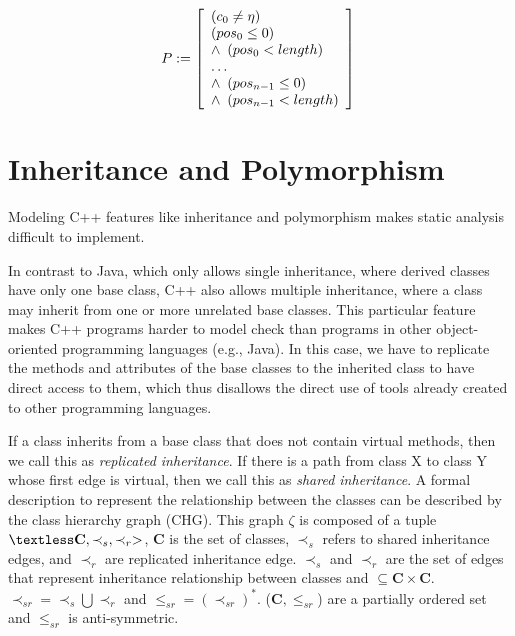 \documentclass[a4paper]{llncs}
\newcommand{\comment}[1]{}
\begin{document}
\begin{equation}
\label{cfind-string-p}
P := \left [ \begin{array}{ll}
				 \left(c_{0} \neq \eta\right) \\
	       \left(pos_{0} \leq 0\right) \\
         \wedge \, \, \left(pos_{0} < length\right)\\
	       \ldots \\
	       \wedge \, \, \left(pos_{n-1} \leq 0\right)\\
	       \wedge \, \, \left(pos_{n-1} < length\right)\\

              \end{array} \right ]  \\
\end{equation}

\section{Inheritance and Polymorphism}
\label{inheritance-and-polymorphism}

Modeling C++ features like inheritance and polymorphism
makes static analysis difficult to implement.
\comment{
Inheritance is one of the main benefits of object-oriented paradigm,
which allows a class (derived class) absorbs data and behavior
from existing classes (base class) and thus enhances it with new features.
This is the vital concept behind the creation of reusable software components
and has received much attention because it is one of the promising ways to
improve software quality.}
In contrast to Java, which only allows single inheritance, where derived classes have only one base
class, C++ also allows multiple inheritance, where a class may inherit from one
or more unrelated base classes. This particular feature makes C++ programs
harder to model check than programs in other object-oriented programming
languages (e.g., Java). In this case, we have to replicate the methods and attributes of the base
classes to the inherited class to have direct access to them,
which thus disallows the direct use of tools already created
to other programming languages.

If a class inherits from a base class that does not contain virtual methods,
then we call this as \textit{replicated inheritance}. If there is a path from
class X to class Y whose first edge is virtual, then we call this as \textit{shared inheritance}.
A formal description to represent the relationship between the classes
can be described by the class hierarchy graph (CHG). This graph $\zeta$ is composed of a tuple
$ \textless \textbf{C}, \prec_{s}, \prec_{r}>$, \textbf{C} is the set of classes,
$\prec_s $ refers to shared inheritance edges, and $\prec_r$ are replicated inheritance edge.
$\prec_{s}$ and $\prec_{r}$ are the set of edges that represent inheritance relationship between
classes and $\subseteq \textbf{C} \times \textbf{C}$.
$\prec_{sr} = \prec_s \bigcup \prec_r$ and $\leq_{sr} = (\prec_{sr})^*$. ($\textbf{C}, \leq_{sr}$)
are a partially ordered set and $\leq_{sr}$ is anti-symmetric.
\end{document}

